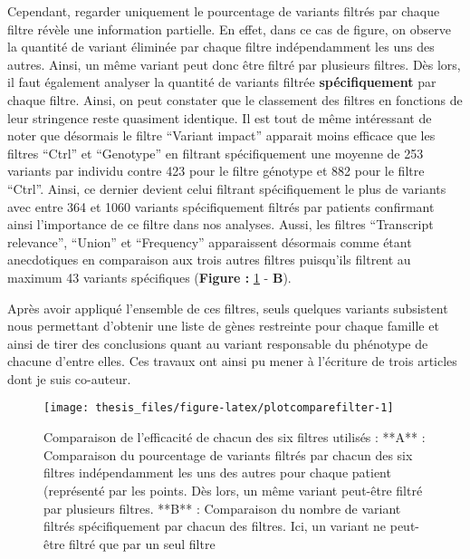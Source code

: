 \documentclass[12pt,twoside]{reedthesis}
\theoremstyle{definition}
\theoremstyle{definition}
\theoremstyle{remark}
\begin{document}
  Cependant, regarder uniquement le pourcentage de variants filtrés par
  chaque filtre révèle une information partielle. En effet, dans ce cas de
  figure, on observe la quantité de variant éliminée par chaque filtre
  indépendamment les uns des autres. Ainsi, un même variant peut donc être
  filtré par plusieurs filtres. Dès lors, il faut également analyser la
  quantité de variants filtrée \textbf{spécifiquement} par chaque filtre.
  Ainsi, on peut constater que le classement des filtres en fonctions de
  leur stringence reste quasiment identique. Il est tout de même
  intéressant de noter que désormais le filtre ``Variant impact'' apparait
  moins efficace que les filtres ``Ctrl'' et ``Genotype'' en filtrant
  spécifiquement une moyenne de 253 variants par individu contre 423 pour
  le filtre génotype et 882 pour le filtre ``Ctrl''. Ainsi, ce dernier
  devient celui filtrant spécifiquement le plus de variants avec entre 364
  et 1060 variants spécifiquement filtrés par patients confirmant ainsi
  l'importance de ce filtre dans nos analyses. Aussi, les filtres
  ``Transcript relevance'', ``Union'' et ``Frequency'' apparaissent
  désormais comme étant anecdotiques en comparaison aux trois autres
  filtres puisqu'ils filtrent au maximum 43 variants spécifiques
  (\textbf{Figure :} \ref{fig:plotcomparefilter} - \textbf{B}).
  
  Après avoir appliqué l'ensemble de ces filtres, seuls quelques variants
  subsistent nous permettant d'obtenir une liste de gènes restreinte pour
  chaque famille et ainsi de tirer des conclusions quant au variant
  responsable du phénotype de chacune d'entre elles. Ces travaux ont ainsi
  pu mener à l'écriture de trois articles dont je suis co-auteur.
  
  \newpage
  
  \begin{figure}
  
  {\centering \texttt{[image: thesis\_files/figure-latex/plotcomparefilter-1]} 
  
  }
  
  \caption[Comparaison de l'efficacité de chacun des six filtres utilisés]{Comparaison de l'efficacité de chacun des six filtres utilisés : **A** : Comparaison du pourcentage de variants filtrés par chacun des six filtres indépendamment les uns des autres pour chaque patient (représenté par les points. Dès lors, un même variant peut-être filtré par plusieurs filtres. **B** : Comparaison du nombre de variant filtrés spécifiquement par chacun des filtres. Ici, un variant ne peut-être filtré que par un seul filtre}\label{fig:plotcomparefilter}
  \end{figure}
  
\end{document}
